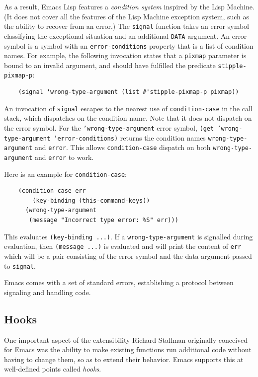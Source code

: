 \documentclass[format=acmsmall, review]{acmart}
\newcommand \Elisp {Emacs Lisp}
\begin{document}
As a result, \Elisp{} features
a \emph{condition system} inspired by the Lisp Machine.  (It does
not cover all the features of the Lisp Machine exception system, such as the ability
to recover from an error.)
The \texttt{signal} function takes an error symbol classifying the
exceptional situation and an additional \texttt{DATA} argument.  An error
symbol is a symbol with an \texttt{error-conditions} property that is a list
of condition names.  For example, the following invocation states that
a \texttt{pixmap} parameter is bound to an invalid argument, and
should have fulfilled the predicate \texttt{stipple-pixmap-p}:
\begin{verbatim}
    (signal 'wrong-type-argument (list #'stipple-pixmap-p pixmap))
\end{verbatim}
An invocation of \texttt{signal} escapes to the nearest use of
\texttt{condition-case} in the call stack, which dispatches on the
condition name.  Note that it does not dispatch on the error symbol.
For the \texttt{'wrong-type-argument} error symbol, \texttt{(get
  'wrong-type-argument 'error-conditions)} returns the condition names
\texttt{wrong-type-argument} and \texttt{error}.  This allows
\texttt{condition-case} dispatch on both \texttt{wrong-type-argument}
and \texttt{error} to work.

Here is an example for \texttt{condition-case}:
\begin{verbatim}
    (condition-case err
        (key-binding (this-command-keys))
      (wrong-type-argument
       (message "Incorrect type error: %S" err)))
\end{verbatim}
This evaluates \texttt{(key-binding ...)}.  If a
\texttt{wrong-type-argument} is signalled during evaluation,
then \texttt{(message ...)} is evaluated and will print the content of
\texttt{err} which will be a pair
consisting of the error symbol and the data argument passed to
\texttt{signal}.

Emacs comes with a set of standard errors, establishing a protocol
between signaling and handling code.

\subsection{Hooks}
\label{sec:hooks}
\label{sec:advice}

One important aspect of the extensibility Richard Stallman originally
conceived for Emacs was the ability to make existing functions run
additional code without having to change them, so as to extend their
behavior.  Emacs supports this at well-defined points called
\emph{hooks}.
\end{document}
